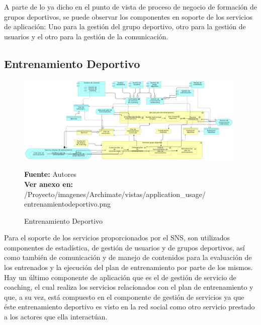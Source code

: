 A parte de lo ya dicho en el punto de vista de proceso de negocio de formación de grupos deportivos, se puede observar los componentes en soporte de los servicios de aplicación: Uno para la gestión del grupo deportivo, otro para la gestión de usuarios y el otro para la gestión de la comunicación.

\subsection{Entrenamiento Deportivo}

\begin{figure}[!htb]
  \begin{center}
    \includegraphics[width=11cm]{./imagenes/Archimate/vistas/application_usage/entrenamientodeportivo.png}
    \caption{Entrenamiento Deportivo}
    \label{fig:au_entrenamiento_deportivo}
    \textbf{Fuente:}  Autores \\
    \textbf{Ver anexo en:} /Proyecto/imagenes/Archimate/vistas/application\_usage/
    entrenamientodeportivo.png
  \end{center}
\end{figure}

Para el soporte de los servicios proporcionados por el SNS, son utilizados componentes de estadística, de gestión de usuarios y de grupos deportivos, así como también de comunicación y de manejo de contenidos para la evaluación de los entrenados y la ejecución del plan de entrenamiento por parte de los mismos. Hay un último componente de aplicación que es el de gestión de servicio de coaching, el cual realiza los servicios relacionados con el plan de entrenamiento y que, a su vez, está compuesto en el componente de gestión de servicios ya que éste entrenamiento deportivo es visto en la red social como otro servicio prestado a los actores que ella interactúan.